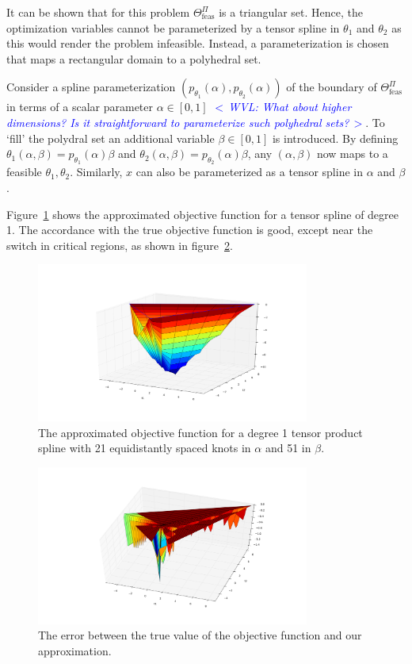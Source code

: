 \documentclass{article}
\newcommand{\ppar}{\theta}                  %
\newcommand{\Pfeas}{\Theta_{\text{feas}}^\Pi}
\newcommand{\commentWVL}[1]{\noindent \textcolor{blue}{\emph{$<\,$WVL: #1$\,>$}}}%
\begin{document}
It can be shown that for this problem $\Pfeas$ is a triangular set.
Hence, the optimization variables cannot be parameterized by a tensor spline
in $\theta_1$ and $\theta_2$ as this would render the problem infeasible.
Instead, a parameterization is chosen that maps a rectangular domain to a
polyhedral set.

Consider a spline parameterization $(p_{\ppar_1}(\alpha),
p_{\ppar_2}(\alpha))$ of the boundary of $\Pfeas$ in terms of a
scalar parameter $\alpha \in [0, 1]$ \commentWVL{What about higher dimensions?
Is it straightforward to parameterize such polyhedral sets?}. To `fill' the
polydral set an additional variable $\beta \in [0, 1]$ is introduced. By
defining $\ppar_1(\alpha,\beta) = p_{\ppar_1}(\alpha) \beta$ and
$\ppar_2(\alpha,\beta) = p_{\ppar_2}(\alpha) \beta$, any $(\alpha, \beta)$ now
maps to a feasible $\ppar_1, \ppar_2$. Similarly, $x$ can also be
parameterized as a tensor spline in $\alpha$ and $\beta$.

Figure~\ref{fig:mplp_objective} shows the approximated objective function for
a tensor spline of degree 1. The accordance with the true objective function
is good, except near the switch in critical regions, as shown in
figure~\ref{fig:mplp_error}.

\begin{figure}
\centering
\includegraphics[width=0.8\textwidth]{figures/mplp_poly_objective.png}
\caption{The approximated objective function for a degree 1 tensor product
spline with 21 equidistantly spaced knots in $\alpha$ and 51 in $\beta$.}
\label{fig:mplp_objective}
\end{figure}

\begin{figure}
\centering
\includegraphics[width=0.8\textwidth]{figures/mplp_poly_error.png}
\caption{The error between the true value of the objective function and our
approximation.}
\label{fig:mplp_error}
\end{figure}




\end{document}
